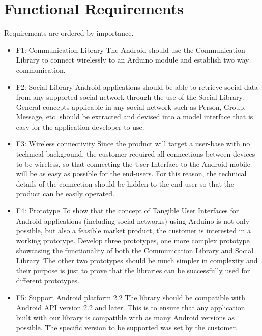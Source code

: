 \section{Functional Requirements}

Requirements are ordered by importance.

\begin{itemize}
\item{F1: Communication Library}\newline
The Android should use the Communication Library to connect wirelessly 
to an Arduino module and establish two way communication.

\item{F2: Social Library}\newline
Android applications should be able to retrieve social data from any 
supported social network through the use of the Social Library. General 
concepts applicable in any social network such as Person, Group, Message, etc.
should be extracted and devised into a model interface that is easy for the application
developer to use.

\item{F3: Wireless connectivity}\newline
Since the product will target a user-base with no technical background,
the customer required all connections between devices to be wireless,
so that connecting the User Interface to the Android mobile will be
as easy as possible for the end-users. For this reason, the technical
details of the connection should be hidden to the end-user so that
the product can be easily operated.

\item{F4: Prototype}\newline
To show that the concept of Tangible User Interfaces for Android applications
(including social networks) using Arduino is not only possible, but
also a feasible market product, the customer is interested in a working
prototype. Develop three prototypes, one more complex prototype showcasing the 
functionality of both the Communication Library and Social Library. The other
two prototypes should be much simpler in complexity and their purpose is just to
prove that the libraries can be successfully used for different prototypes.

\item{F5: Support Android platform 2.2}\newline
The library should be compatible with Android API version 2.2 and later. This is to
ensure that any application built with our library is compatible with as many Android
versions as possible. The specific version to be supported was set by the customer.
\end{itemize}


